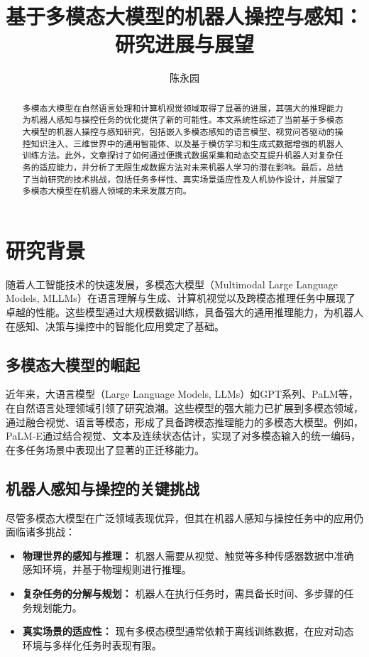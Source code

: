 \documentclass[a4paper]{article}
\title{基于多模态大模型的机器人操控与感知：研究进展与展望}
\author{陈永园}
\begin{document}
\maketitle
\begin{abstract}
多模态大模型在自然语言处理和计算机视觉领域取得了显著的进展，其强大的推理能力为机器人感知与操控任务的优化提供了新的可能性。本文系统性综述了当前基于多模态大模型的机器人操控与感知研究，包括嵌入多模态感知的语言模型、视觉问答驱动的操控知识注入、三维世界中的通用智能体、以及基于模仿学习和生成式数据增强的机器人训练方法。此外，文章探讨了如何通过便携式数据采集和动态交互提升机器人对复杂任务的适应能力，并分析了无限生成数据方法对未来机器人学习的潜在影响。最后，总结了当前研究的技术挑战，包括任务多样性、真实场景适应性及人机协作设计，并展望了多模态大模型在机器人领域的未来发展方向。
\end{abstract}

\section{研究背景}

随着人工智能技术的快速发展，多模态大模型（Multimodal Large Language Models, MLLMs）在语言理解与生成、计算机视觉以及跨模态推理任务中展现了卓越的性能。这些模型通过大规模数据训练，具备强大的通用推理能力，为机器人在感知、决策与操控中的智能化应用奠定了基础。

\subsection{多模态大模型的崛起}
近年来，大语言模型（Large Language Models, LLMs）如GPT系列、PaLM等，在自然语言处理领域引领了研究浪潮。这些模型的强大能力已扩展到多模态领域，通过融合视觉、语言等模态，形成了具备跨模态推理能力的多模态大模型。例如，PaLM-E通过结合视觉、文本及连续状态估计，实现了对多模态输入的统一编码，在多任务场景中表现出了显著的正迁移能力。

\subsection{机器人感知与操控的关键挑战}
尽管多模态大模型在广泛领域表现优异，但其在机器人感知与操控任务中的应用仍面临诸多挑战：
\begin{itemize}
    \item \textbf{物理世界的感知与推理：} 机器人需要从视觉、触觉等多种传感器数据中准确感知环境，并基于物理规则进行推理。
    \item \textbf{复杂任务的分解与规划：} 机器人在执行任务时，需具备长时间、多步骤的任务规划能力。
    \item \textbf{真实场景的适应性：} 现有多模态模型通常依赖于离线训练数据，在应对动态环境与多样化任务时表现有限。
\end{itemize}
\end{document}
